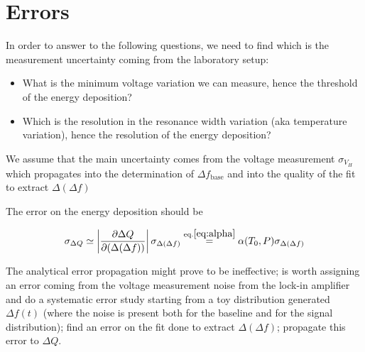 \documentclass[a4paper,12pt]{article}
\begin{document}

\section{Errors}

In order to answer to the following questions, we need to find which is the measurement uncertainty coming from the laboratory setup:
\begin{itemize}

  \item What is the minimum voltage variation we can measure, hence the threshold of the energy deposition? 
  \item Which is the resolution in the resonance width variation (aka temperature variation), hence the resolution of the energy deposition?

\end{itemize}

We assume that the main uncertainty comes from the voltage measurement $\sigma_{V_H}$ which propagates into the determination of $\Delta f_\mathrm{base}$
and into the quality of the fit to extract $\Delta (\Delta f)$

The error on the energy deposition should be

\begin{equation}
  \sigma_{\Delta Q}  \simeq \left| \frac{\partial \Delta Q}{\partial(\Delta(\Delta f))} \right| \sigma_{\Delta (\Delta f)} \overset{\mathrm{eq. \ref{eq:alpha}}}{=} \alpha (T_0,P) \sigma_{\Delta (\Delta f)}
\end{equation}

The analytical error propagation might prove to be ineffective; is worth assigning an error coming from the voltage measurement noise from the lock-in amplifier and do a systematic error study starting from a toy distribution generated $\Delta f(t)$ (where the noise is present both for the baseline and for the signal distribution); find an error on the fit done to extract $\Delta (\Delta f)$; propagate this error to $\Delta Q$.
\end{document}
